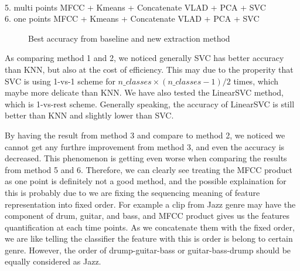 \documentclass[final]{siamltexmm}
\begin{document}
\\ 5. multi points MFCC + Kmeans + Concatenate VLAD + PCA + SVC
\\ 6. one points MFCC + Kmeans + Concatenate VLAD + PCA + SVC
\begin{figure}%
    \centering
    \qquad
    \caption{Best accuracy from baseline and new extraction method}%
    \label{fig:example}%
\end{figure}

As comparing method 1 and 2, we noticed generally SVC has better accuracy than KNN, but also at the cost of efficiency. This may due to the properity that SVC is using 1-vs-1 scheme for $n\_classes\times(n\_classes-1)/2$ times, which maybe more delicate than KNN. We have also tested the LinearSVC method, which is 1-vs-rest scheme. Generally speaking, the accuracy of LinearSVC is still better than KNN and slightly lower than SVC.

By having the result from method 3 and compare to method 2, we noticed we cannot get any furthre improvement from method 3, and even the accuracy is decreased. This phenomenon is getting even worse when comparing the results from method 5 and 6. Therefore, we can clearly see treating the MFCC product as one point is definitely not a good method, and the possible explaination for this is probably due to we are fixing the sequencing meaning of feature representation into fixed order. For example a clip from Jazz genre may have the component of drum, guitar, and bass, and MFCC product gives us the features quantification at each time points. As we concatenate them with the fixed order, we are like telling the classifier the feature with this is order is belong to certain genre. However, the order of drump-guitar-bass or guitar-bass-drump should be equally considered as Jazz.
\end{document}
